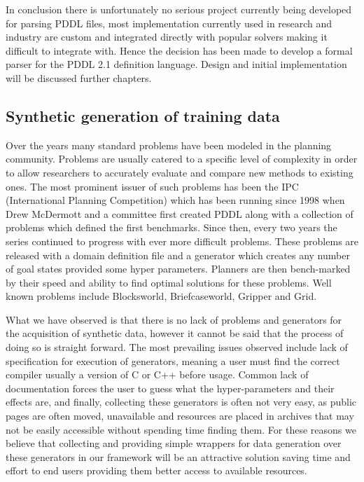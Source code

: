 In conclusion there is unfortunately no serious project currently being developed for parsing PDDL files, most implementation currently used in research and industry are custom and integrated directly with popular solvers making it difficult to integrate with. Hence the decision has been made to develop a formal parser for the PDDL 2.1 definition language. Design and initial implementation will be discussed further chapters.  

\subsection{Synthetic generation of training data}
Over the years many standard problems have been modeled in the planning community. Problems are usually catered to a specific level of complexity in order to allow researchers to accurately evaluate and compare new methods to existing ones. The most prominent issuer of such problems has been the IPC (International Planning Competition) which has been running since 1998 when Drew McDermott and a committee first created PDDL along with a collection of problems which defined the first benchmarks. Since then, every two years the series continued to progress with ever more difficult problems. These problems are released with a domain definition file and a generator which creates any number of goal states provided some hyper parameters. Planners are then bench-marked by their speed and ability to find optimal solutions for these problems. Well known problems include Blocksworld, Briefcaseworld, Gripper and Grid. 

What we have observed is that there is no lack of problems and generators for the acquisition of synthetic data, however it cannot be said that the process of doing so is straight forward. The most prevailing issues observed include lack of specification for execution of generators, meaning a user must find the correct compiler usually a version of C or C++ before usage. Common lack of documentation forces the user to guess what the hyper-parameters and their effects are, and finally, collecting these generators is often not very easy, as public pages are often moved, unavailable and resources are placed in archives that may not be easily accessible without spending time finding them. For these reasons we believe that collecting and providing simple wrappers for data generation over these generators in our framework will be an attractive solution saving time and effort to end users providing them better access to available resources.

